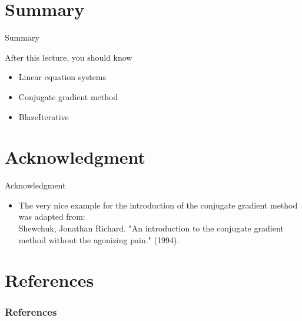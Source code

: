 \documentclass[12pt,t]{beamer}
\begin{document}
\section{Summary}
\begin{frame}{Summary}
\begin{block}{After this lecture, you should know}
\begin{itemize}
\item Linear equation systems
\item Conjugate gradient method
\item BlazeIterative
\end{itemize}
\end{block}
\end{frame}


\section*{Acknowledgment}

\begin{frame}{Acknowledgment}
\begin{itemize}
\item The very nice example for the introduction of the conjugate gradient method was adapted from:\\
\vspace{0.25cm}
Shewchuk, Jonathan Richard. "An introduction to the conjugate gradient method without the agonizing pain." (1994).

\end{itemize}
\end{frame}

\section{References}

\begin{frame}[t, allowframebreaks]
\frametitle{References}


\end{frame}
\end{document}
